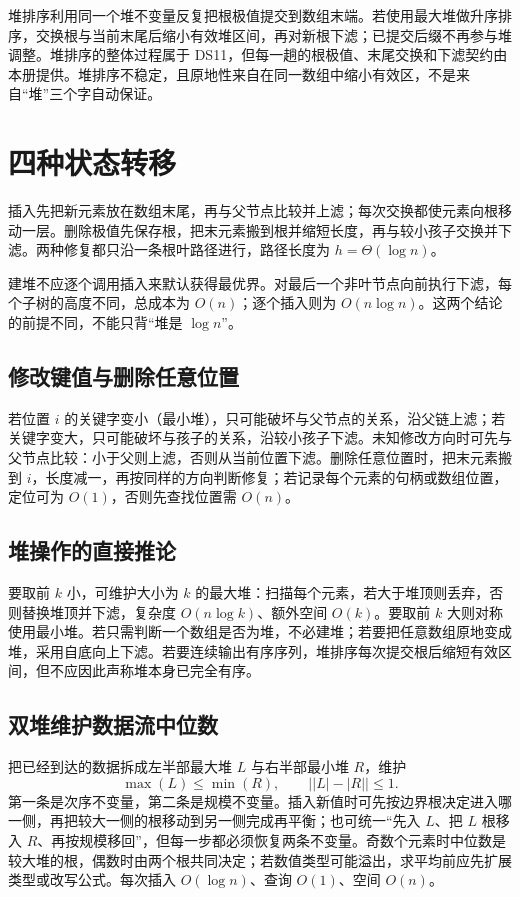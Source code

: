 \documentclass[UTF8,fontset=none,11pt,a4paper]{ctexart}
\begin{document}
堆排序利用同一个堆不变量反复把根极值提交到数组末端。若使用最大堆做升序排序，交换根与当前末尾后缩小有效堆区间，再对新根下滤；已提交后缀不再参与堆调整。堆排序的整体过程属于 DS11，但每一趟的根极值、末尾交换和下滤契约由本册提供。堆排序不稳定，且原地性来自在同一数组中缩小有效区，不是来自“堆”三个字自动保证。

\section{四种状态转移}
插入先把新元素放在数组末尾，再与父节点比较并上滤；每次交换都使元素向根移动一层。删除极值先保存根，把末元素搬到根并缩短长度，再与较小孩子交换并下滤。两种修复都只沿一条根叶路径进行，路径长度为 $h=\Theta(\log n)$。

建堆不应逐个调用插入来默认获得最优界。对最后一个非叶节点向前执行下滤，每个子树的高度不同，总成本为 $O(n)$；逐个插入则为 $O(n\log n)$。这两个结论的前提不同，不能只背“堆是 $\log n$”。

\subsection{修改键值与删除任意位置}
若位置 $i$ 的关键字变小（最小堆），只可能破坏与父节点的关系，沿父链上滤；若关键字变大，只可能破坏与孩子的关系，沿较小孩子下滤。未知修改方向时可先与父节点比较：小于父则上滤，否则从当前位置下滤。删除任意位置时，把末元素搬到 $i$，长度减一，再按同样的方向判断修复；若记录每个元素的句柄或数组位置，定位可为 $O(1)$，否则先查找位置需 $O(n)$。

\subsection{堆操作的直接推论}
要取前 $k$ 小，可维护大小为 $k$ 的最大堆：扫描每个元素，若大于堆顶则丢弃，否则替换堆顶并下滤，复杂度 $O(n\log k)$、额外空间 $O(k)$。要取前 $k$ 大则对称使用最小堆。若只需判断一个数组是否为堆，不必建堆；若要把任意数组原地变成堆，采用自底向上下滤。若要连续输出有序序列，堆排序每次提交根后缩短有效区间，但不应因此声称堆本身已完全有序。

\subsection{双堆维护数据流中位数}
把已经到达的数据拆成左半部最大堆 $L$ 与右半部最小堆 $R$，维护
\[
\max(L)\le \min(R),\qquad \bigl||L|-|R|\bigr|\le 1.
\]
第一条是次序不变量，第二条是规模不变量。插入新值时可先按边界根决定进入哪一侧，再把较大一侧的根移动到另一侧完成再平衡；也可统一“先入 $L$、把 $L$ 根移入 $R$、再按规模移回”，但每一步都必须恢复两条不变量。奇数个元素时中位数是较大堆的根，偶数时由两个根共同决定；若数值类型可能溢出，求平均前应先扩展类型或改写公式。每次插入 $O(\log n)$、查询 $O(1)$、空间 $O(n)$。
\end{document}
